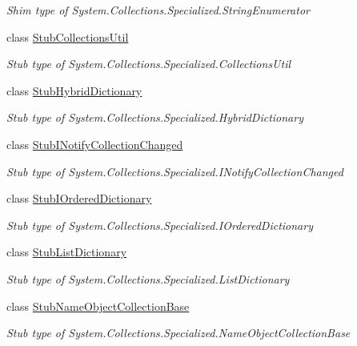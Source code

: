 \begin{DoxyCompactItemize}
\begin{DoxyCompactList}\small\item\em Shim type of System.\-Collections.\-Specialized.\-String\-Enumerator\end{DoxyCompactList}\item 
class \hyperlink{class_system_1_1_collections_1_1_specialized_1_1_fakes_1_1_stub_collections_util}{Stub\-Collections\-Util}
\begin{DoxyCompactList}\small\item\em Stub type of System.\-Collections.\-Specialized.\-Collections\-Util\end{DoxyCompactList}\item 
class \hyperlink{class_system_1_1_collections_1_1_specialized_1_1_fakes_1_1_stub_hybrid_dictionary}{Stub\-Hybrid\-Dictionary}
\begin{DoxyCompactList}\small\item\em Stub type of System.\-Collections.\-Specialized.\-Hybrid\-Dictionary\end{DoxyCompactList}\item 
class \hyperlink{class_system_1_1_collections_1_1_specialized_1_1_fakes_1_1_stub_i_notify_collection_changed}{Stub\-I\-Notify\-Collection\-Changed}
\begin{DoxyCompactList}\small\item\em Stub type of System.\-Collections.\-Specialized.\-I\-Notify\-Collection\-Changed\end{DoxyCompactList}\item 
class \hyperlink{class_system_1_1_collections_1_1_specialized_1_1_fakes_1_1_stub_i_ordered_dictionary}{Stub\-I\-Ordered\-Dictionary}
\begin{DoxyCompactList}\small\item\em Stub type of System.\-Collections.\-Specialized.\-I\-Ordered\-Dictionary\end{DoxyCompactList}\item 
class \hyperlink{class_system_1_1_collections_1_1_specialized_1_1_fakes_1_1_stub_list_dictionary}{Stub\-List\-Dictionary}
\begin{DoxyCompactList}\small\item\em Stub type of System.\-Collections.\-Specialized.\-List\-Dictionary\end{DoxyCompactList}\item 
class \hyperlink{class_system_1_1_collections_1_1_specialized_1_1_fakes_1_1_stub_name_object_collection_base}{Stub\-Name\-Object\-Collection\-Base}
\begin{DoxyCompactList}\small\item\em Stub type of System.\-Collections.\-Specialized.\-Name\-Object\-Collection\-Base\end{DoxyCompactList}\item 

\end{DoxyCompactItemize}
